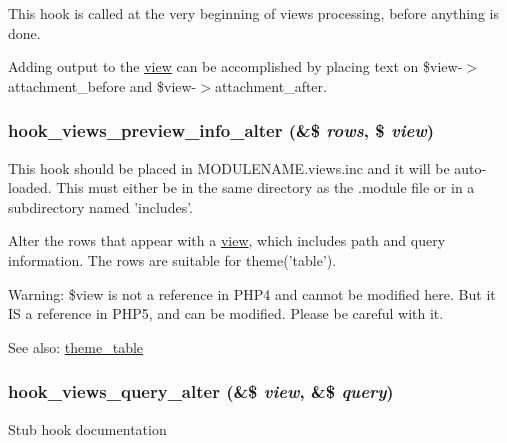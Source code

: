 This hook is called at the very beginning of views processing, before anything is done.

Adding output to the \hyperlink{classview}{view} can be accomplished by placing text on \$view-$>$attachment\_\-before and \$view-$>$attachment\_\-after. \hypertarget{group__views__hooks_gfeafa28dd3e140b2d4f8cfdfc7d76922}{
\subsubsection[{hook\_\-views\_\-preview\_\-info\_\-alter}]{\setlength{\rightskip}{0pt plus 5cm}hook\_\-views\_\-preview\_\-info\_\-alter (\&\$ {\em rows}, \/  \$ {\em view})}}
\label{group__views__hooks_gfeafa28dd3e140b2d4f8cfdfc7d76922}


This hook should be placed in MODULENAME.views.inc and it will be auto-loaded. This must either be in the same directory as the .module file or in a subdirectory named 'includes'.

Alter the rows that appear with a \hyperlink{classview}{view}, which includes path and query information. The rows are suitable for theme('table').

Warning: \$view is not a reference in PHP4 and cannot be modified here. But it IS a reference in PHP5, and can be modified. Please be careful with it.

\begin{Desc}
\item[See also:]\hyperlink{group__themeable_g77f053aaa73bbeaa3943bf8f06ce625d}{theme\_\-table} \end{Desc}
\hypertarget{group__views__hooks_gf4d538493930fe0fa0ce6fb3bf42c156}{
\subsubsection[{hook\_\-views\_\-query\_\-alter}]{\setlength{\rightskip}{0pt plus 5cm}hook\_\-views\_\-query\_\-alter (\&\$ {\em view}, \/  \&\$ {\em query})}}
\label{group__views__hooks_gf4d538493930fe0fa0ce6fb3bf42c156}


Stub hook documentation

